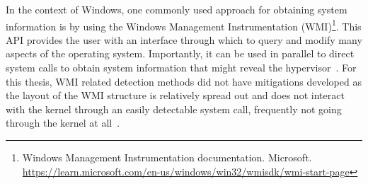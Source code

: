 In the context of Windows, one commonly used approach for obtaining system information is by using the Windows Management Instrumentation (WMI)\footnote{Windows Management Instrumentation documentation. Microsoft. \url{https://learn.microsoft.com/en-us/windows/win32/wmisdk/wmi-start-page}}.
This API provides the user with an interface through which to query and modify many aspects of the operating system. 
Importantly, it can be used in parallel to direct system calls to obtain system information that might reveal the hypervisor~\cite{graeber2015abusing}.
For this thesis, WMI related detection methods did not have mitigations developed as the layout of the WMI structure is relatively spread out and 
does not interact with the kernel through an easily detectable system call, frequently not going through the kernel at all~\cite{wmi-structure}.



